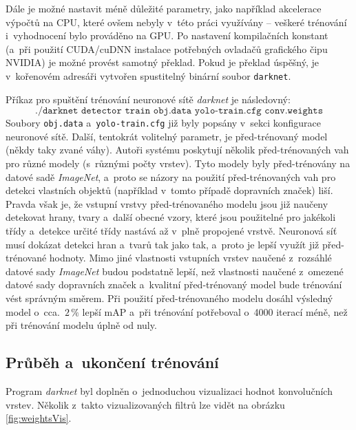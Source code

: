 Dále je možné nastavit méně důležité parametry, jako například akcelerace výpočtů na CPU, které ovšem nebyly v~této práci využívány -- veškeré trénování i~vyhodnocení bylo prováděno na GPU. Po nastavení kompilačních konstant (a~při použití CUDA/cuDNN instalace potřebných ovladačů grafického čipu NVIDIA) je možné provést samotný překlad. Pokud je překlad úspěšný, je v~kořenovém adresáři vytvořen spustitelný binární soubor \texttt{darknet}.

Příkaz pro spuštění trénování neuronové sítě \emph{darknet} je následovný:
$$\texttt{./darknet detector train obj.data yolo-train.cfg conv.weights}$$
Soubory \texttt{obj.data} a~\texttt{yolo-train.cfg} již byly popsány v~sekci konfigurace neuronové sítě. Další, tentokrát volitelný parametr, je před-trénovaný model (někdy taky zvané váhy). Autoři systému poskytují několik před-trénovaných vah pro různé modely (s~různými počty vrstev). Tyto modely byly před-trénovány na datové sadě \emph{ImageNet}, a~proto se názory na použití před-trénovaných vah pro detekci vlastních objektů (například v~tomto případě dopravních značek) liší. Pravda však je, že vstupní vrstvy před-trénovaného modelu jsou již naučeny detekovat hrany, tvary a~další obecné vzory, které jsou použitelné pro jakékoli třídy a~detekce určité třídy nastává až v~plně propojené vrstvě. Neuronová síť musí dokázat detekci hran a~tvarů tak jako tak, a~proto je lepší využít již před-trénované hodnoty. Mimo jiné vlastnosti vstupních vrstev naučené z~rozsáhlé datové sady \emph{ImageNet} budou podstatně lepší, než vlastnosti naučené z~omezené datové sady dopravních značek a~kvalitní před-trénovaný model bude trénování vést správným směrem. Při použití před-trénovaného modelu dosáhl výsledný model o~cca.~$2\,\%$ lepší mAP a~při trénování potřeboval o~4000 iterací méně, než při trénování modelu úplně od nuly.

\subsection*{Průběh a~ukončení trénování}
Program \emph{darknet} byl doplněn o~jednoduchou vizualizaci hodnot konvolučních vrstev. Několik z~takto vizualizovaných filtrů lze vidět na obrázku \ref{fig:weightsVis}.

